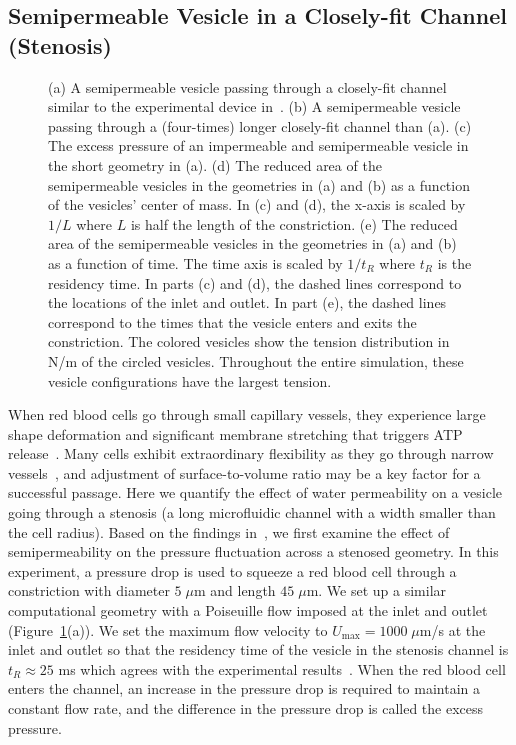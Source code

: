 \documentclass[prb,preprint,showpacs,preprintnumbers,amsmath,amssymb,longbibliography]{revtex4-1}
\newif\ifTikz
\begin{document}
\subsection{Semipermeable Vesicle in a Closely-fit Channel (Stenosis)}
 \begin{figure}[hbp]
  \centering
  
  \caption{\label{fig:stenosisComposite} (a) A semipermeable vesicle
   passing through a closely-fit channel similar to the experimental
   device in~\cite{abk-fai-sto2006}. (b) A semipermeable vesicle passing
   through a  (four-times) longer closely-fit channel than (a). (c) The
   excess pressure of an impermeable and semipermeable vesicle in the
   short geometry in (a). (d) The reduced area of the semipermeable
   vesicles in the geometries in (a) and (b) as a function of the
   vesicles' center of mass. In (c) and (d), the x-axis is scaled by
   $1/L$ where $L$ is half the length of the constriction. (e) The
   reduced area of the semipermeable vesicles in the geometries in (a)
   and (b) as a function of time. The time axis is scaled by $1/t_R$
   where $t_R$ is the residency time. In parts (c) and (d), the dashed
   lines correspond to the locations of the inlet and outlet. In part
   (e), the dashed lines correspond to the times that the vesicle enters
   and exits the constriction. The colored vesicles show the tension
   distribution in N/m of the circled vesicles. Throughout the entire
   simulation, these vesicle configurations have the largest tension.}
\end{figure}


When red blood cells go through small capillary vessels, they experience
large shape deformation and significant membrane stretching that
triggers ATP release~\cite{Wan2008_PNAS, ForsythWan2011_PNAS}.  Many
cells exhibit extraordinary flexibility as they go through narrow
vessels~\cite{AuStoreyMoore2016_PNAS}, and adjustment of
surface-to-volume ratio may be a key factor for a successful passage.
Here we quantify the effect of water permeability on a vesicle going
through a stenosis (a long microfluidic channel with a width smaller
than the cell radius).  Based on the findings in~\cite{abk-fai-sto2006},
we first examine the effect of semipermeability on the pressure
fluctuation across a stenosed geometry. In this experiment, a pressure
drop is used to squeeze a red blood cell through a constriction with
diameter $5\;\mu$m and length $45\;\mu$m. We set up a similar
computational geometry with a Poiseuille flow imposed at the inlet and
outlet (Figure~\ref{fig:stenosisComposite}(a)). We set the maximum flow
velocity to $U_{\max} = 1000 \;\mu$m/s at the inlet and outlet so that
the residency time of the vesicle in the stenosis channel is $t_R
\approx 25$ ms which agrees with the experimental
results~\cite{abk-fai-sto2006}. When the red blood cell enters the
channel, an increase in the pressure drop is required to maintain a
constant flow rate, and the difference in the pressure drop is called
the excess pressure.
\end{document}
